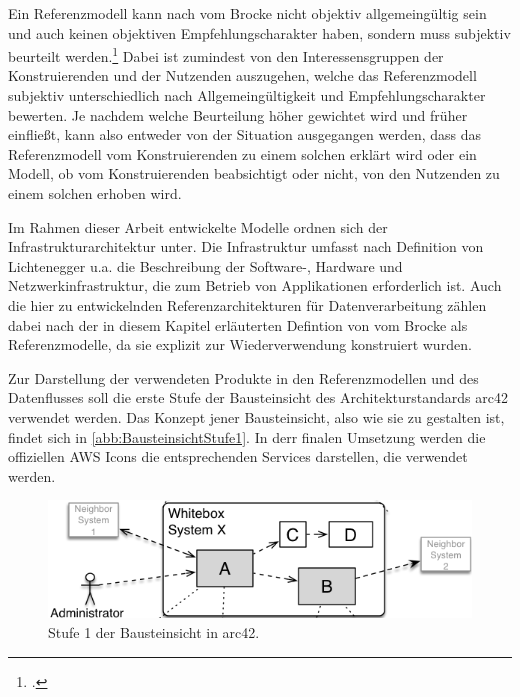 Ein Referenzmodell kann nach vom Brocke nicht objektiv allgemeingültig sein und auch keinen objektiven Empfehlungscharakter haben, sondern muss subjektiv beurteilt werden.\footcite[Vgl. auch im Folgenden][31~f.]{vomBrocke.2003}  Dabei ist zumindest von den Interessensgruppen der Konstruierenden und der Nutzenden auszugehen, welche das Referenzmodell subjektiv unterschiedlich nach Allgemeingültigkeit und Empfehlungscharakter bewerten. Je nachdem welche Beurteilung höher gewichtet wird und früher einfließt, kann also entweder von der Situation ausgegangen werden, dass das Referenzmodell vom Konstruierenden zu einem solchen erklärt wird oder ein Modell, ob vom Konstruierenden beabsichtigt oder nicht, von den Nutzenden zu einem solchen erhoben wird.


Im Rahmen dieser Arbeit entwickelte Modelle ordnen sich der Infrastrukturarchitektur unter. Die Infrastruktur umfasst nach Definition von Lichtenegger u.a. die Beschreibung der Software-, Hardware und Netzwerkinfrastruktur, die zum Betrieb von Applikationen erforderlich ist.  Auch die hier zu entwickelnden Referenzarchitekturen für Datenverarbeitung zählen dabei nach der in diesem Kapitel erläuterten Defintion von vom Brocke als Referenzmodelle, da sie explizit zur Wiederverwendung konstruiert wurden.

Zur Darstellung der verwendeten Produkte in den Referenzmodellen und des Datenflusses soll die erste Stufe der Bausteinsicht des Architekturstandards arc42 verwendet werden. Das Konzept jener Bausteinsicht, also wie sie zu gestalten ist, findet sich in \autoref{abb:BausteinsichtStufe1}. In derr finalen Umsetzung werden die offiziellen \ac{AWS} Icons die entsprechenden Services darstellen, die verwendet werden.

\begin{figure}[H]
\centering
\includegraphics[width=\textwidth]{graphics/erste-Stufe-Bausteinsicht.png}
\caption[Stufe 1 der Bausteinsicht in arc42]{Stufe 1 der Bausteinsicht in arc42.\footnotemark}
\label{abb:BausteinsichtStufe1}
\end{figure}




